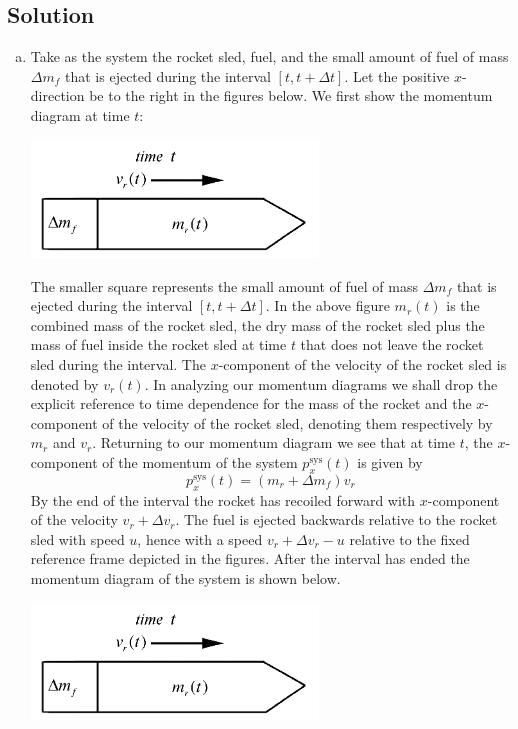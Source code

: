 \documentclass[solutions]{esg8012exam}
\begin{document}
\subsection{Solution}
  \begin{enumerate}[(a)]
    \item
      Take as the system the rocket sled, fuel, and the small amount of fuel of mass $\Delta m_f$ that is ejected during the interval $[t, t + \Delta t]$. Let the positive $x$-direction be to the right in the figures below. We first show the momentum diagram at time $t$:
      \begin{center}\includegraphics[width=0.6\textwidth]{exam2_s3_1}\end{center}
      The smaller square represents the small amount of fuel of mass $\Delta m_f$ that is ejected during the interval $[t,t+\Delta t]$. In the above figure $m_r (t)$ is the combined mass of the rocket sled, the dry mass of the rocket sled plus the mass of fuel inside the rocket sled at time $t$ that does not leave the rocket sled during the interval. The $x$-component of the velocity of the rocket sled is denoted by $v_r(t)$.  In analyzing our momentum diagrams we shall drop the explicit reference to time dependence for the mass of the rocket and the $x$-component of the velocity of the rocket sled, denoting them respectively by $m_r$ and $v_r $. Returning to our momentum diagram we see that at time $t$, the $x$-component of the momentum of the system $p_x^\text{sys}(t)$ is given by
      \begin{equation} p_x^\text{sys}(t)=(m_r +\Delta m_f) v_r  \label{eq:3:p_x^sys(t)} \end{equation}
      By the end of the interval the rocket has recoiled forward with $x$-component of the velocity $v_r +\Delta v_r $. The fuel is ejected backwards relative to the rocket sled with speed $u$, hence with a speed $v_r +\Delta v_r -u$ relative to the fixed reference frame depicted in the figures. After the interval has ended the momentum diagram of the system is shown below.
      \begin{center}\includegraphics[width=0.6\textwidth]{exam2_s3_1}\end{center}

\end{enumerate}
\end{document}
